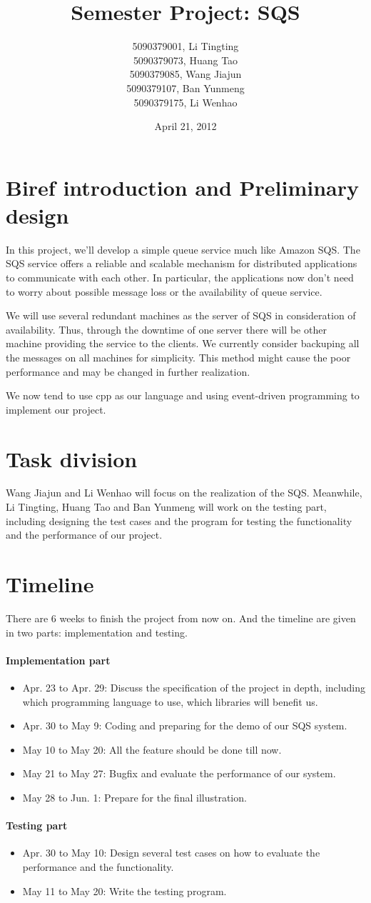 \documentclass[a4paper,12pt,titlepage]{article}
\title{Semester Project: SQS}
\author{5090379001, Li Tingting\\
        5090379073, Huang Tao\\
        5090379085, Wang Jiajun\\
        5090379107, Ban Yunmeng\\
        5090379175, Li Wenhao}
\date{April 21, 2012}
\begin{document}
\maketitle
\section{Biref introduction and Preliminary design}
In this project, we'll develop a simple queue service much like Amazon SQS. The SQS service offers a reliable and scalable mechanism for distributed applications to communicate with each other. In particular, the applications now don't need to worry about possible message loss or the availability of queue service.

We will use several redundant machines as the server of SQS in consideration of availability. Thus, through the downtime of one server there will be other machine providing the service to the clients. We currently consider backuping all the messages on all machines for simplicity. This method might cause the poor performance and may be changed in further realization.

We now tend to use cpp as our language and using event-driven programming to implement our project.
\section{Task division}
Wang Jiajun and Li Wenhao will focus on the realization of the SQS. Meanwhile, Li Tingting, Huang Tao and Ban Yunmeng will work on the testing part, including designing the test cases and the program for testing the functionality and the performance of our project.
\section{Timeline}
There are 6 weeks to finish the project from now on. And the timeline are given in two parts: implementation and testing.
\paragraph{Implementation part}
\begin{itemize}
 \item Apr. 23 to Apr. 29: Discuss the specification of the project in depth, including which programming language to use, which libraries will benefit us.
 \item Apr. 30 to May 9: Coding and preparing for the demo of our SQS system.
 \item May 10 to May 20: All the feature should be done till now.
 \item May 21 to May 27: Bugfix and evaluate the performance of our system.
 \item May 28 to Jun. 1: Prepare for the final illustration.
\end{itemize}
\paragraph{Testing part}
\begin{itemize}
 \item Apr. 30 to May 10: Design several test cases on how to evaluate the performance and the functionality.
 \item May 11 to May 20: Write the testing program.
\end{itemize}
\end{document}
